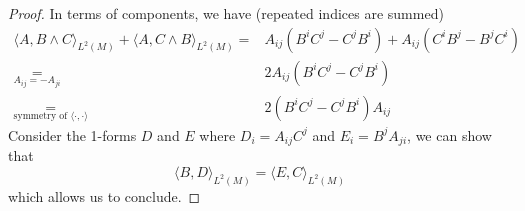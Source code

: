 \begin{proof}
In terms of components, we have (repeated indices are summed)
\begin{equation*}
\begin{split}
\langle A, B\wedge C \rangle_{L^2(M)} + \langle A, C\wedge B \rangle_{L^2(M)} = & 
A_{ij}(B^i C^j - C^j B^i) + A_{ij}(C^i B^j - B^j C^i) \\
\underset{A_{ij} = -A_{ji}}{=} & 2 A_{ij}(B^i C^j - C^j B^i)\\
\underset{\textrm{symmetry of }\langle \cdot, \cdot \rangle}{ = } &2 (B^i C^j - C^j B^i)A_{ij}
\end{split}
\end{equation*}
Consider the 1-forms $D$ and $E$ where $D_i = A_{ij}C^j$ and $E_i = B^j A_{ji}$, we can show that 
\begin{equation*}
\langle B, D\rangle_{L^2{(M)}} = \langle E, C \rangle_{L^2(M)}
\end{equation*}
which allows us to conclude.
\end{proof}









